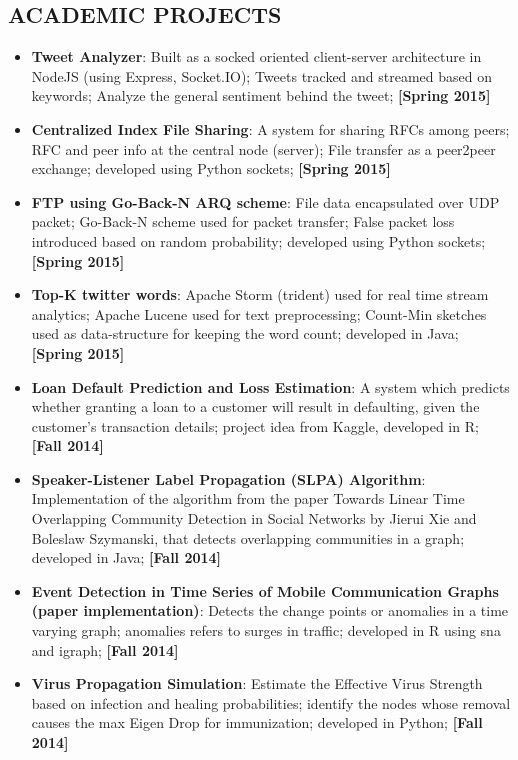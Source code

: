 \documentclass{article}
\begin{document}
\begin{multicols}{2}
		\section*{ACADEMIC PROJECTS}
			\vspace{-0.1cm}
			\begin{itemize}[nolistsep,leftmargin=*]
				\item \textbf{Tweet Analyzer}: Built as a socked oriented client-server architecture in NodeJS (using Express, Socket.IO); Tweets tracked and streamed based on keywords; Analyze the general sentiment behind the tweet; \textbf{[Spring 2015]}
				\item \textbf{Centralized Index File Sharing}: A system for sharing RFCs among peers; RFC and peer info at the central node (server); File transfer as a peer2peer exchange; developed using Python sockets; \textbf{[Spring 2015]}
				\item \textbf{FTP using Go-Back-N ARQ scheme}: File data encapsulated over UDP packet; Go-Back-N scheme used for packet transfer; False packet loss introduced based on random probability; developed using Python sockets; \textbf{[Spring 2015]}
				\item \textbf{Top-K twitter words}: Apache Storm (trident) used for real time stream analytics; Apache Lucene used for text preprocessing; Count-Min sketches used as data-structure for keeping the word count; developed in Java; \textbf{[Spring 2015]}
				\item \textbf{Loan Default Prediction and Loss Estimation}: A system which predicts whether granting a loan to a customer will result in defaulting, given the customer's transaction details; project idea from Kaggle, developed in R; \textbf{[Fall 2014]}
				\item \textbf{Speaker-Listener Label Propagation (SLPA) Algorithm}: Implementation of the algorithm from the paper Towards Linear Time Overlapping Community Detection in Social Networks by Jierui Xie and Boleslaw Szymanski, that detects overlapping communities in a graph; developed in Java; \textbf{[Fall 2014]}
				\item \textbf{Event Detection in Time Series of Mobile Communication Graphs (paper implementation)}: Detects the change points or anomalies in a time varying graph; anomalies refers to surges in traffic; developed in R using sna and igraph; \textbf{[Fall 2014]}
				\item \textbf{Virus Propagation Simulation}: Estimate the Effective Virus Strength based on infection and healing probabilities; identify the nodes whose removal causes the max Eigen Drop for immunization; developed in Python; \textbf{[Fall 2014]}

\end{itemize}
\end{multicols}
\end{document}
